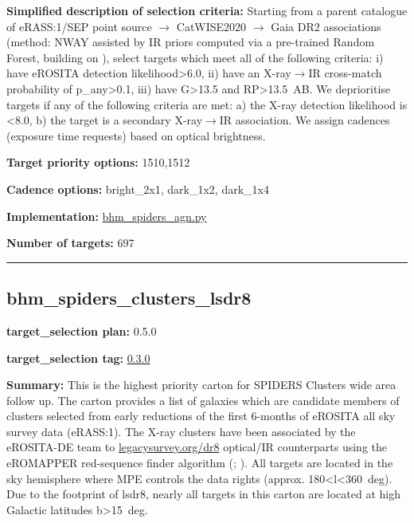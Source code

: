 \noindent\textbf{Simplified description of selection criteria:} Starting from a
parent catalogue of eRASS:1/SEP point source $\rightarrow$ CatWISE2020 $\rightarrow$ Gaia DR2
associations (method: NWAY assisted by IR priors computed via a
pre-trained Random Forest, building on
\citealt{Salvato2022}), select targets which meet all of the following criteria:
i) have eROSITA detection likelihood\textgreater6.0, ii) have an
X-ray$\rightarrow$IR cross-match probability of p\_any\textgreater0.1, iii) have
G\textgreater13.5 and RP\textgreater13.5~AB. We deprioritise targets if
any of the following criteria are met: a) the X-ray detection likelihood
is \textless8.0, b) the target is a secondary X-ray$\rightarrow$IR association. We
assign cadences (exposure time requests) based on optical brightness.


\noindent\textbf{Target priority options:} 1510,1512

\noindent\textbf{Cadence options:} bright\_2x1, dark\_1x2, dark\_1x4

\noindent\textbf{Implementation:}
\href{https://github.com/sdss/target_selection/blob/0.3.0/python/target_selection/cartons/bhm_spiders_agn.py}{bhm\_spiders\_agn.py}

\noindent\textbf{Number of targets:} 697

\begin{center}\rule{0.5\linewidth}{0.5pt}\end{center}

\hypertarget{bhm_spiders_clusters_lsdr8_plan0.5.0}{%
\subsection{bhm\_spiders\_clusters\_lsdr8}\label{bhm_spiders_clusters_lsdr8_plan0.5.0}}

\noindent\textbf{target\_selection plan:} 0.5.0

\noindent\textbf{target\_selection tag:}
\href{https://github.com/sdss/target_selection/tree/0.3.0/}{0.3.0}

\noindent\textbf{Summary:} This is the highest priority carton for SPIDERS
Clusters wide area follow up. The carton provides a list of galaxies
which are candidate members of clusters selected from early reductions
of the first 6-months of eROSITA all sky survey data (eRASS:1). The
X-ray clusters have been associated by the eROSITA-DE team to
\href{https://www.legacysurvey.org/dr8/}{legacysurvey.org/dr8}
optical/IR counterparts using the eROMAPPER red-sequence finder
algorithm
(\citealt{Rykoff2014};
\citealt{IderChitham2020}). All targets are located in the sky hemisphere
where MPE controls the data rights (approx.
180\textless l\textless360~deg). Due to the footprint of lsdr8, nearly
all targets in this carton are located at high Galactic latitudes
\textbar b\textbar\textgreater15~deg.

